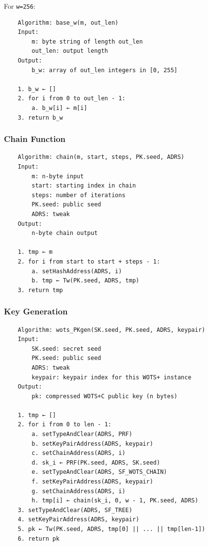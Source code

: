For \texttt{w=256}:
\begin{verbatim}
    Algorithm: base_w(m, out_len)
    Input:
        m: byte string of length out_len
        out_len: output length 
    Output:
        b_w: array of out_len integers in [0, 255]

    1. b_w ← []
    2. for i from 0 to out_len - 1:
        a. b_w[i] ← m[i]
    3. return b_w
\end{verbatim}

\subsubsection{Chain Function}
\begin{verbatim}
    Algorithm: chain(m, start, steps, PK.seed, ADRS)
    Input:
        m: n-byte input
        start: starting index in chain
        steps: number of iterations
        PK.seed: public seed
        ADRS: tweak
    Output:
        n-byte chain output

    1. tmp ← m
    2. for i from start to start + steps - 1:
        a. setHashAddress(ADRS, i)
        b. tmp ← Tw(PK.seed, ADRS, tmp)
    3. return tmp
\end{verbatim}

\subsubsection{Key Generation}
\begin{verbatim}
    Algorithm: wots_PKgen(SK.seed, PK.seed, ADRS, keypair)
    Input:
        SK.seed: secret seed
        PK.seed: public seed
        ADRS: tweak
        keypair: keypair index for this WOTS+ instance
    Output:
        pk: compressed WOTS+C public key (n bytes)

    1. tmp ← []
    2. for i from 0 to len - 1:
        a. setTypeAndClear(ADRS, PRF)
        b. setKeyPairAddress(ADRS, keypair)
        c. setChainAddress(ADRS, i)
        d. sk_i ← PRF(PK.seed, ADRS, SK.seed)
        e. setTypeAndClear(ADRS, SF_WOTS_CHAIN)
        f. setKeyPairAddress(ADRS, keypair)
        g. setChainAddress(ADRS, i)
        h. tmp[i] ← chain(sk_i, 0, w - 1, PK.seed, ADRS)
    3. setTypeAndClear(ADRS, SF_TREE)
    4. setKeyPairAddress(ADRS, keypair)
    5. pk ← Tw(PK.seed, ADRS, tmp[0] || ... || tmp[len-1])
    6. return pk
\end{verbatim}

